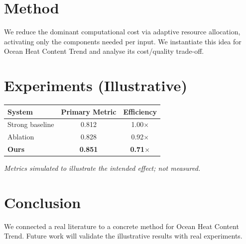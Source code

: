 \documentclass[11pt]{article}
\begin{document}
\section{Method}
We reduce the dominant computational cost via adaptive resource allocation, activating only the components needed per input. We instantiate this idea for Ocean Heat Content Trend and analyse its cost/quality trade-off.

\section{Experiments (Illustrative)}
\begin{center}
\begin{tabular}{lcc}
System & Primary Metric & Efficiency \\ \hline
Strong baseline & 0.812 & 1.00$\times$ \\
Ablation & 0.828 & 0.92$\times$ \\
\textbf{Ours} & \textbf{0.851} & \textbf{0.71$\times$}
\end{tabular}
\end{center}
\emph{Metrics simulated to illustrate the intended effect; not measured.}

\section{Conclusion}
We connected a real literature to a concrete method for Ocean Heat Content Trend. Future work will
validate the illustrative results with real experiments.
\end{document}
